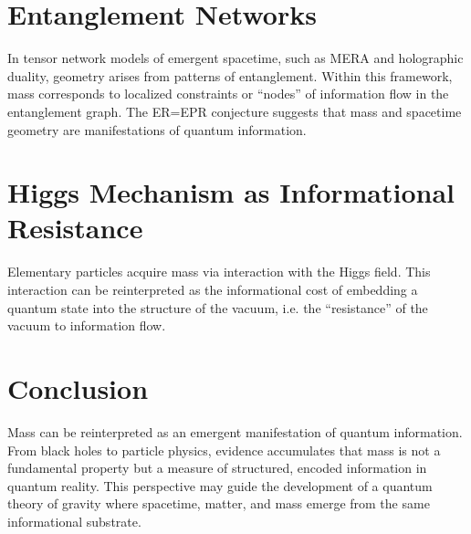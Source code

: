 \documentclass[12pt]{article}
\begin{document}
\section{Entanglement Networks}
In tensor network models of emergent spacetime, such as MERA and holographic duality,
geometry arises from patterns of entanglement. Within this framework, mass corresponds
to localized constraints or ``nodes'' of information flow in the entanglement graph.
The ER=EPR conjecture suggests that mass and spacetime geometry are manifestations
of quantum information.

\section{Higgs Mechanism as Informational Resistance}
Elementary particles acquire mass via interaction with the Higgs field.
This interaction can be reinterpreted as the informational cost of embedding
a quantum state into the structure of the vacuum, i.e. the ``resistance''
of the vacuum to information flow.

\section{Conclusion}
Mass can be reinterpreted as an emergent manifestation of quantum information.
From black holes to particle physics, evidence accumulates that mass is not
a fundamental property but a measure of structured, encoded information
in quantum reality. This perspective may guide the development of a
quantum theory of gravity where spacetime, matter, and mass emerge from
the same informational substrate.
\end{document}
